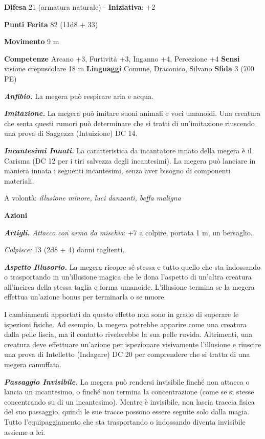 \begin{multicols}{2}
\textbf{Difesa} 21 (armatura naturale) - \textbf{Iniziativa}: +2

\textbf{Punti Ferita} 82 (11d8 + 33)

\textbf{Movimento} 9 m

\textbf{Competenze} Arcano +3, Furtività +3, Inganno +4, Percezione +4
\textbf{Sensi} visione crepuscolare 18 m
\textbf{Linguaggi} Comune, Draconico, Silvano \textbf{Sfida} 3 (700 PE)\smallskip

\emph{\textbf{Anfibio.}} La megera può respirare aria e acqua.

\emph{\textbf{Imitazione.}} La megera può imitare suoni animali e voci
umanoidi. Una creatura che senta questi rumori può determinare che si
tratti di un'imitazione riuscendo una prova di Saggezza (Intuizione) DC
14.

\emph{\textbf{Incantesimi Innati.}} La caratteristica da incantatore
innato della megera è il Carisma (DC 12 per i tiri salvezza degli
incantesimi). La megera può lanciare in maniera innata i seguenti
incantesimi, senza aver bisogno di componenti materiali.

A volontà: \emph{illusione minore, luci danzanti, beffa maligna}

\smallskip\textbf{Azioni}

\emph{\textbf{Artigli.} Attacco con arma da mischia}: +7 a colpire,
portata 1 m, un bersaglio.

\emph{Colpisce:} 13 (2d8 + 4) danni taglienti.

\emph{\textbf{Aspetto Illusorio.}} La megera ricopre sé stessa e tutto
quello che sta indossando o trasportando in un'illusione magica che le
dona l'aspetto di un'altra creatura all'incirca della stessa taglia e
forma umanoide. L'illusione termina se la megera effettua un'azione
bonus per terminarla o se muore.

I cambiamenti apportati da questo effetto non sono in grado di superare
le ispezioni fisiche. Ad esempio, la megera potrebbe apparire come una
creatura dalla pelle liscia, ma il contatto rivelerebbe la sua pelle
ruvida. Altrimenti, una creatura deve effettuare un'azione per
ispezionare visivamente l'illusione e riuscire una prova di Intelletto
(Indagare) DC 20 per comprendere che si tratta di una megera camuffata.

\emph{\textbf{Passaggio Invisibile.}} La megera può rendersi invisibile
finché non attacca o lancia un incantesimo, o finché non termina la
concentrazione (come se si stesse concentrando su di un incantesimo).
Mentre è invisibile, non lascia traccia fisica del suo passaggio, quindi
le sue tracce possono essere seguite solo dalla magia. Tutto
l'equipaggiamento che sta trasportando o indossando diventa invisibile
assieme a lei.


\end{multicols}
